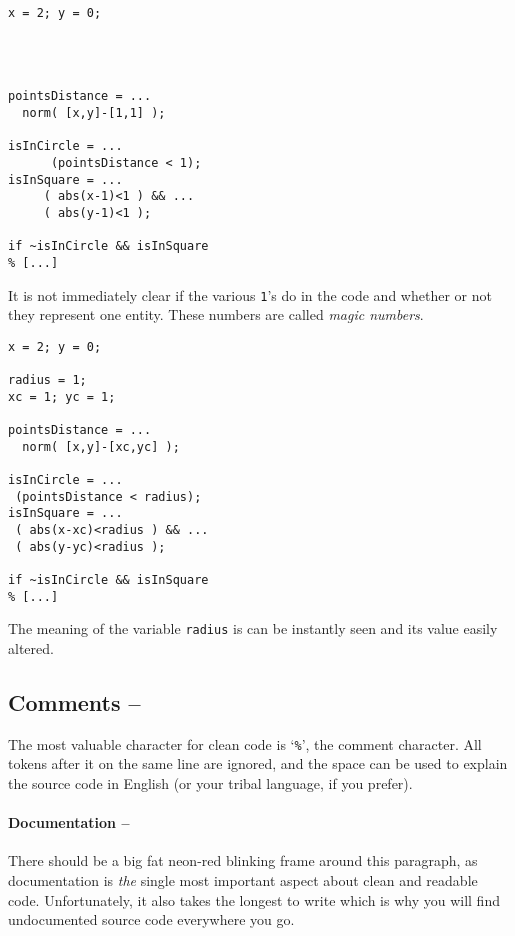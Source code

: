 \hfill
\begin{minipage}[t]{.45\textwidth}\label{example:magic-numbers}
\begin{lstlisting}[framerule=2pt,rulecolor=\color{badred}]
x = 2; y = 0;




pointsDistance = ...
  norm( [x,y]-[1,1] );

isInCircle = ...
      (pointsDistance < 1);
isInSquare = ...
     ( abs(x-1)<1 ) && ...
     ( abs(y-1)<1 );

if ~isInCircle && isInSquare
% [...]
\end{lstlisting}
It is not immediately clear if the various \lstinline!1!'s do in the code and whether or not they represent one entity. These numbers are called \emph{magic numbers}.
\end{minipage}
\hfill
\begin{minipage}[t]{.45\textwidth}
\begin{lstlisting}[framerule=2pt,rulecolor=\color{goodgreen}]
x = 2; y = 0;

radius = 1;
xc = 1; yc = 1;

pointsDistance = ...
  norm( [x,y]-[xc,yc] );

isInCircle = ...
 (pointsDistance < radius);
isInSquare = ...
 ( abs(x-xc)<radius ) && ...
 ( abs(y-yc)<radius );

if ~isInCircle && isInSquare
% [...]
\end{lstlisting}
The meaning of the variable \lstinline!radius! is can be instantly seen and its value easily altered.
\end{minipage}
\hfill


\subsection{Comments  -- \cleansymbol\cleansymbol\cleansymbol\cleansymbol\cleansymbol}

The most valuable character for clean \matlab{} code is `\lstinline!%!',
the comment character. All tokens after it on the same line are ignored, and the space can be used to explain the source code in English (or your tribal language, if you prefer).

\paragraph{Documentation -- \cleansymbol\cleansymbol\cleansymbol\cleansymbol\cleansymbol}
There should be a big fat neon-red blinking frame around this paragraph, as documentation is \emph{the} single most important aspect about clean and readable code. Unfortunately, it also takes the longest to write which is why you will find undocumented source code everywhere you go.

